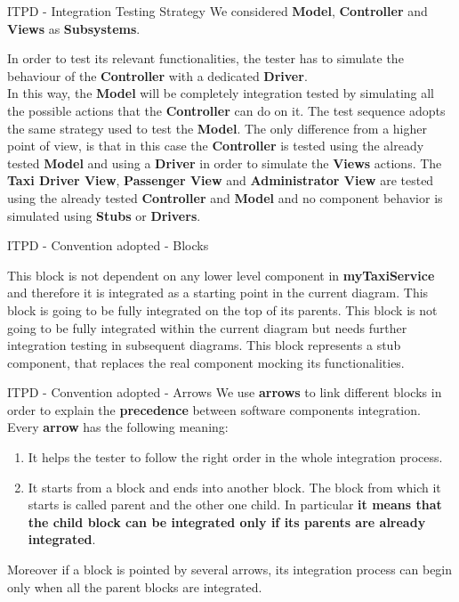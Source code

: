 \documentclass{../common/latex_classes/pdf_presentation}
\begin{document}
	\begin{frame}{ITPD - Integration Testing Strategy}
		We considered \textbf{Model}, \textbf{Controller} and \textbf{Views} as \textbf{Subsystems}. \\
		\medskip
		\begin{itemize}
			 In order to test its relevant functionalities, the tester has to simulate the behaviour of the \textbf{Controller} with a dedicated \textbf{Driver}. \\
			In this way, the \textbf{Model} will be completely integration tested by simulating all the possible actions that the \textbf{Controller} can do on it.
			 The test sequence adopts the same strategy used to test the \textbf{Model}. The only difference from a higher point of view, is that in this case the \textbf{Controller} is tested using the already tested \textbf{Model} and using a \textbf{Driver} in order to simulate the \textbf{Views} actions.
			 The \textbf{Taxi Driver View}, \textbf{Passenger View} and \textbf{Administrator View} are tested using the already tested \textbf{Controller} and \textbf{Model} and no component behavior is simulated using \textbf{Stubs} or \textbf{Drivers}.
		\end{itemize}
	\end{frame}
	\begin{frame}{ITPD - Convention adopted - Blocks}
		\begin{itemize}
			 This block is not dependent on any lower level component in \textbf{myTaxiService} and therefore it is integrated as a starting point in the current diagram.
			 This block is going to be fully integrated on the top of its parents.
			 This block is not going to be fully integrated within the current diagram but needs further integration testing in subsequent diagrams.
			 This block represents a stub component, that replaces the real component mocking its functionalities.
		\end{itemize}
	\end{frame}
	\begin{frame}{ITPD - Convention adopted - Arrows}
		We use \textbf{arrows} to link different blocks in order to explain the \textbf{precedence} between software components integration. \\
		\medskip
		Every \textbf{arrow} has the following meaning:
		\begin{enumerate}
			\item It helps the tester to follow the right order in the whole integration process.
			\item It starts from a block and ends into another block. The block from which it starts is called parent and the other one child. In particular \textbf{it means that the child block can be integrated only if its parents are already integrated}.
		\end{enumerate}
		\medskip
		Moreover if a block is pointed by several arrows, its integration process can begin only when all the parent blocks are integrated.
	\end{frame}
\end{document}

